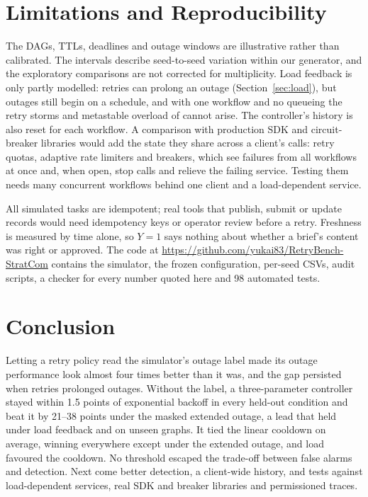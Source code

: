 \documentclass[conference,a4paper]{IEEEtran}
\begin{document}
\section{Limitations and Reproducibility}\label{sec:limits}
The DAGs, TTLs, deadlines and outage windows are illustrative rather than calibrated. The intervals describe seed-to-seed variation within our generator, and the exploratory comparisons are not corrected for multiplicity. Load feedback is only partly modelled: retries can prolong an outage (Section~\ref{sec:load}), but outages still begin on a schedule, and with one workflow and no queueing the retry storms and metastable overload of \cite{bronson,huang} cannot arise. The controller's history is also reset for each workflow. A comparison with production SDK and circuit-breaker libraries would add the state they share across a client's calls: retry quotas, adaptive rate limiters and breakers, which see failures from all workflows at once and, when open, stop calls and relieve the failing service. Testing them needs many concurrent workflows behind one client and a load-dependent service.

All simulated tasks are idempotent; real tools that publish, submit or update records would need idempotency keys or operator review before a retry. Freshness is measured by time alone, so $Y=1$ says nothing about whether a brief's content was right or approved. The code at \url{https://github.com/yukai83/RetryBench-StratCom} contains the simulator, the frozen configuration, per-seed CSVs, audit scripts, a checker for every number quoted here and 98 automated tests.

\section{Conclusion}
Letting a retry policy read the simulator's outage label made its outage performance look almost four times better than it was, and the gap persisted when retries prolonged outages. Without the label, a three-parameter controller stayed within 1.5 points of exponential backoff in every held-out condition and beat it by 21--38 points under the masked extended outage, a lead that held under load feedback and on unseen graphs. It tied the linear cooldown on average, winning everywhere except under the extended outage, and load favoured the cooldown. No threshold escaped the trade-off between false alarms and detection. Next come better detection, a client-wide history, and tests against load-dependent services, real SDK and breaker libraries and permissioned traces.
\end{document}
